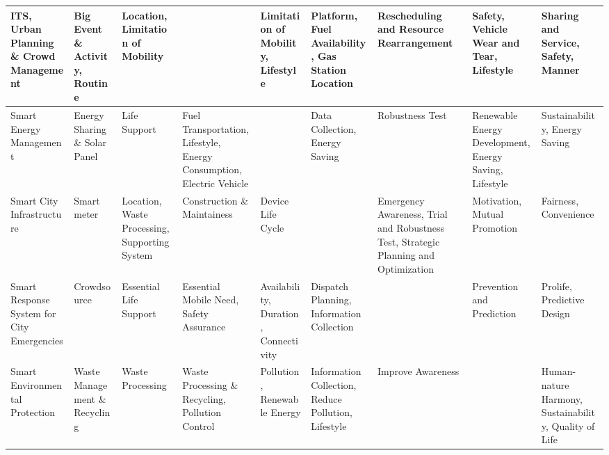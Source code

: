 \documentclass[letterpaper, twocolumn, 10pt, conference]{IEEEtran}
\begin{document}
\begin{landscape}
\begin{table}[p]
\begin{center}
\begin{tabularx}{1.3\textwidth}{|Y|Y|Y|Y|Y|Y|Y|Y|Y|}
                	ITS, Urban Planning \& Crowd Management    & Big Event \& Activity, Routine                                           & Location, Limitation of Mobility              &                                                                      & Limitation of Mobility, Lifestyle        & Platform, Fuel Availability, Gas Station Location   & Rescheduling and Resource Rearrangement                                             & Safety, Vehicle Wear and Tear, Lifestyle               & Sharing and Service, Safety, Manner                                  \\ \hline
                	Smart Energy Management                    & Energy Sharing \& Solar Panel                                            & Life Support                                  & Fuel Transportation, Lifestyle, Energy Consumption, Electric Vehicle &                                          & Data Collection, Energy Saving                      & Robustness Test                                                                     & Renewable Energy Development, Energy Saving, Lifestyle & Sustainability, Energy Saving                                        \\ \hline
                	Smart City Infrastructure                  & Smart meter                                                              & Location, Waste Processing, Supporting System & Construction \& Maintainess                                          & Device Life Cycle                        &                                                     & Emergency Awareness, Trial and Robustness Test, Strategic Planning and Optimization & Motivation, Mutual Promotion                           & Fairness, Convenience                                                \\ \hline
                	Smart Response System for City Emergencies & Crowdsource                                                              & Essential Life Support                        & Essential Mobile Need, Safety Assurance                              & Availability, Duration, Connectivity     & Dispatch Planning, Information Collection           &                                                                                     & Prevention and Prediction                              & Prolife, Predictive Design                                           \\ \hline
                	Smart Environmental Protection             & Waste Management \& Recycling                                            & Waste Processing                              & Waste Processing \& Recycling, Pollution Control                     & Pollution, Renewable Energy              & Information Collection, Reduce Pollution, Lifestyle & Improve Awareness                                                                   &                                                        & Human-nature Harmony, Sustainability, Quality of Life                \\ \hline

\end{tabularx}
\end{center}
\end{table}
\end{landscape}
\end{document}
